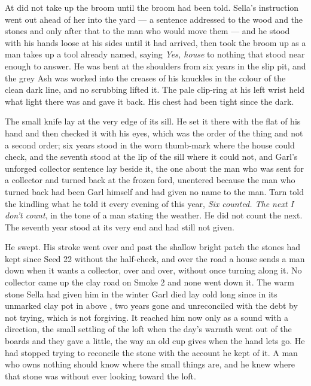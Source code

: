 \scenebreak

At   did not take up the broom until the broom had been told. Sella's instruction went out ahead of her into the yard --- a sentence addressed to the wood and the stones and only after that to the man who would move them --- and he stood with his hands loose at his sides until it had arrived, then took the broom up as a man takes up a tool already named, saying \emph{Yes, house} to nothing that stood near enough to answer. He was bent at the shoulders from six years in the slip pit, and the grey Ash was worked into the creases of his knuckles in the colour of the clean dark line, and no scrubbing lifted it. The pale clip-ring at his left wrist held what light there was and gave it back. His chest had been tight since the dark.

The small knife lay at the very edge of its sill. He set it there with the flat of his hand and then checked it with his eyes, which was the order of the thing and not a second order; six years stood in the worn thumb-mark where the house could check, and the seventh stood at the lip of the sill where it could not, and Garl's unforged collector sentence lay beside it, the one about the man who was sent for a collector and turned back at the frozen ford, unentered because the man who turned back had been Garl himself and had given no name to the man. Tarn told the kindling what he told it every evening of this year, \emph{Six counted. The next I don't count}, in the tone of a man stating the weather. He did not count the next. The seventh year stood at its very end and had still not given.

He swept. His stroke went over  and past the shallow bright patch the stones had kept since Seed 22 without the half-check, and over the road a house sends a man down when it wants a collector, over and over, without once turning along it. No collector came up the clay road on Smoke 2 and none went down it. The warm stone Sella had given him in the winter Garl died lay cold long since in its unmarked clay pot in  above , two years gone and unreconciled with the debt by not trying, which is not forgiving. It reached him now only as a sound with a direction, the small settling of the loft when the day's warmth went out of the boards and they gave a little, the way an old cup gives when the hand lets go. He had stopped trying to reconcile the stone with the account he kept of it. A man who owns nothing should know where the small things are, and he knew where that stone was without ever looking toward the loft.

